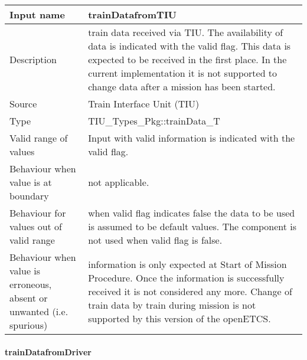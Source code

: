 \begin{longtable}{p{}p{}}
\toprule
Input name				& trainDatafromTIU \\
\midrule
Description				& train data received via TIU. The availability of data is indicated with the valid flag. This data is expected to be received in the first place. In the current implementation it is not supported to change data after a mission has been started.\\
\midrule
Source					& Train Interface Unit (TIU) \\ 
\midrule
Type					& TIU\_Types\_Pkg::trainData\_T \\
\midrule
Valid range of values	& Input with valid information is indicated with the valid flag. \\
\midrule
Behaviour when value is at boundary	& not applicable.\\
\midrule
Behaviour for values out of valid range	& when valid flag indicates false the data to be used is assumed to be default values. The component is not used when valid flag is false.\\
\midrule
Behaviour when value is erroneous, absent or unwanted (i.e. spurious) & information is only expected at Start of Mission Procedure. Once the information is successfully received it is not considered any more. Change of train data by train during mission is not supported by this version of the openETCS.\\
\bottomrule
\end{longtable}

\paragraph{trainDatafromDriver}

